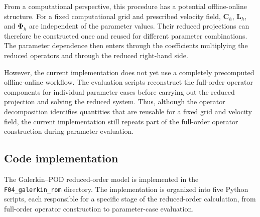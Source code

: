 From a computational perspective, this procedure has a
potential offline-online structure. For a fixed
computational grid and prescribed velocity field,
$\mathbf{C}_h$, $\mathbf{L}_h$, and
$\boldsymbol{\Phi}_h$ are independent of the parameter
values. Their reduced projections can therefore be
constructed once and reused for different parameter
combinations. The parameter dependence then enters
through the coefficients multiplying the reduced
operators and through the reduced right-hand side.

However, the current implementation does not yet use
a completely precomputed offline-online workflow.
The evaluation scripts reconstruct the full-order
operator components for individual parameter cases
before carrying out the reduced projection and solving
the reduced system. Thus, although the operator
decomposition identifies quantities that are reusable
for a fixed grid and velocity field, the current
implementation still repeats part of the full-order
operator construction during parameter evaluation.

\subsection{Code implementation}
\label{subsec:rom_code_implementation}

The Galerkin--POD reduced-order model is implemented in the
\texttt{F04\_galerkin\_rom} directory. The implementation is
organized into five Python scripts, each responsible for a
specific stage of the reduced-order calculation, from
full-order operator construction to parameter-case evaluation.

